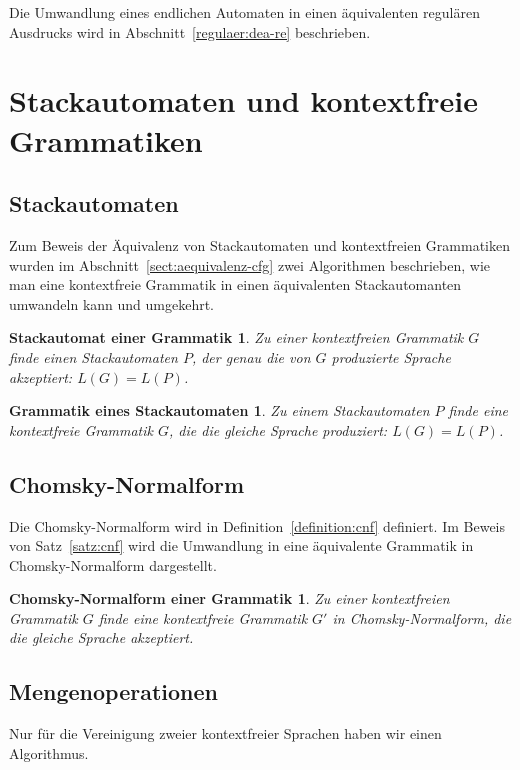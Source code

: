 Die Umwandlung eines endlichen Automaten in einen äquivalenten
regulären Ausdrucks 
wird in Abschnitt~\ref{regulaer:dea-re} beschrieben.

\section{Stackautomaten und kontextfreie Grammatiken}

\subsection{Stackautomaten}
Zum Beweis der Äquivalenz von Stackautomaten und kontextfreien Grammatiken
wurden im Abschnitt~\ref{sect:aequivalenz-cfg} zwei Algorithmen beschrieben,
wie man eine kontextfreie Grammatik in einen äquivalenten Stackautomanten
umwandeln kann und umgekehrt.

\newtheorem*{CfgPDA}{Stackautomat einer Grammatik}
\begin{CfgPDA}
Zu einer kontextfreien Grammatik $G$ finde einen Stackautomaten $P$, 
der genau die von $G$ produzierte Sprache akzeptiert: $L(G)=L(P)$.
\end{CfgPDA}

\newtheorem*{PdaCfg}{Grammatik eines Stackautomaten}
\begin{PdaCfg}
Zu einem Stackautomaten $P$ finde eine kontextfreie Grammatik $G$, die
die gleiche Sprache produziert: $L(G)=L(P)$.
\end{PdaCfg}

\subsection{Chomsky-Normalform}
Die Chomsky-Normalform wird in Definition~\ref{definition:cnf} definiert.
Im Beweis von Satz~\ref{satz:cnf} wird die Umwandlung in eine äquivalente
Grammatik in Chomsky-Normalform dargestellt.

\newtheorem*{CNF}{Chomsky-Normalform einer Grammatik}
\begin{CNF}
Zu einer kontextfreien Grammatik $G$ finde eine kontextfreie Grammatik $G'$
in Chomsky-Normalform, die die gleiche Sprache akzeptiert.
\end{CNF}

\subsection{Mengenoperationen}
Nur für die Vereinigung zweier kontextfreier Sprachen haben wir einen
Algorithmus.


